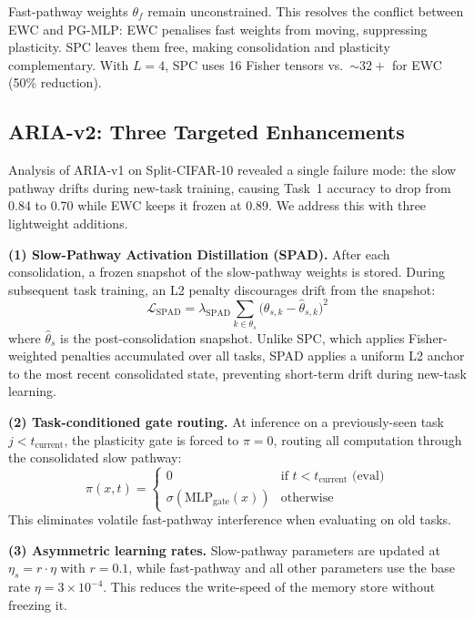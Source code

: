 \documentclass[10pt,twocolumn]{article}
\begin{document}
Fast-pathway weights $\theta_f$ remain unconstrained. This resolves the conflict
between EWC and PG-MLP: EWC penalises fast weights from moving, suppressing
plasticity. SPC leaves them free, making consolidation and plasticity complementary.
With $L=4$, SPC uses 16 Fisher tensors vs.\ ${\sim}32+$ for EWC (50\% reduction).

\subsection{ARIA-v2: Three Targeted Enhancements}
\label{sec:ariav2}

Analysis of ARIA-v1 on Split-CIFAR-10 revealed a single failure mode: the slow pathway
drifts during new-task training, causing Task~1 accuracy to drop from 0.84 to 0.70 while
EWC keeps it frozen at 0.89. We address this with three lightweight additions.

\textbf{(1) Slow-Pathway Activation Distillation (SPAD).}
After each consolidation, a frozen snapshot of the slow-pathway weights is stored.
During subsequent task training, an L2 penalty discourages drift from the snapshot:
\begin{equation}
  \mathcal{L}_{\mathrm{SPAD}} = \lambda_{\mathrm{SPAD}} \sum_{k \in \theta_s}
    \bigl(\theta_{s,k} - \hat\theta_{s,k}\bigr)^2
\end{equation}
where $\hat\theta_s$ is the post-consolidation snapshot. Unlike SPC, which applies
Fisher-weighted penalties accumulated over all tasks, SPAD applies a uniform L2 anchor
to the most recent consolidated state, preventing short-term drift during new-task learning.

\textbf{(2) Task-conditioned gate routing.}
At inference on a previously-seen task $j < t_{\mathrm{current}}$, the plasticity gate
is forced to $\pi = 0$, routing all computation through the consolidated slow pathway:
\begin{equation}
  \pi(x, t) = \begin{cases} 0 & \text{if } t < t_{\mathrm{current}} \text{ (eval)} \\ \sigma(\mathrm{MLP}_{\mathrm{gate}}(x)) & \text{otherwise} \end{cases}
\end{equation}
This eliminates volatile fast-pathway interference when evaluating on old tasks.

\textbf{(3) Asymmetric learning rates.}
Slow-pathway parameters are updated at $\eta_s = r \cdot \eta$ with $r = 0.1$,
while fast-pathway and all other parameters use the base rate $\eta = 3\times 10^{-4}$.
This reduces the write-speed of the memory store without freezing it.
\end{document}
